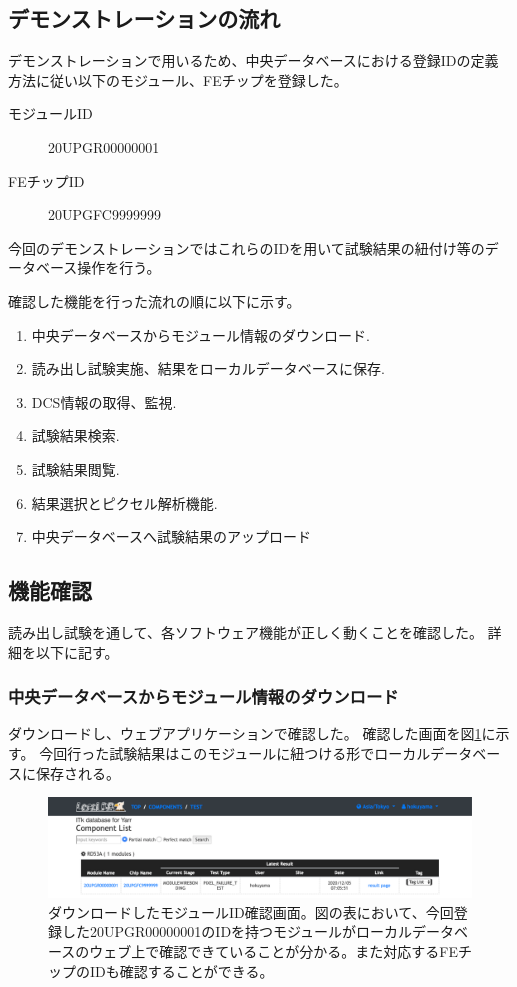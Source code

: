 \clearpage
\subsection{デモンストレーションの流れ}
デモンストレーションで用いるため、中央データベースにおける登録IDの定義方法\cite{5-11}に従い以下のモジュール、FEチップを登録した。

\begin{description}
  \item[モジュールID] 20UPGR00000001
  \item[FEチップID] 20UPGFC9999999
\end{description}
今回のデモンストレーションではこれらのIDを用いて試験結果の紐付け等のデータベース操作を行う。

確認した機能を行った流れの順に以下に示す。
\begin{enumerate}
  \item 中央データベースからモジュール情報のダウンロード.
  \item 読み出し試験実施、結果をローカルデータベースに保存.
  \item DCS情報の取得、監視.
  \item 試験結果検索.
  \item 試験結果閲覧.
  \item 結果選択とピクセル解析機能.
  \item 中央データベースへ試験結果のアップロード
\end{enumerate}

\subsection{機能確認}
読み出し試験を通して、各ソフトウェア機能が正しく動くことを確認した。
詳細を以下に記す。

\subsubsection{中央データベースからモジュール情報のダウンロード}
ダウンロードし、ウェブアプリケーションで確認した。
確認した画面を図\ref{demo_download_SCC}に示す。
今回行った試験結果はこのモジュールに紐つける形でローカルデータベースに保存される。

\begin{figure}[bpt]\centering
\includegraphics[width=16cm]{./demo_download_SCC.pdf}
\caption[ダウンロードしたモジュールID確認画面]{ダウンロードしたモジュールID確認画面。図の表において、今回登録した20UPGR00000001のIDを持つモジュールがローカルデータベースのウェブ上で確認できていることが分かる。また対応するFEチップのIDも確認することができる。}
\label{demo_download_SCC}
\end{figure}

